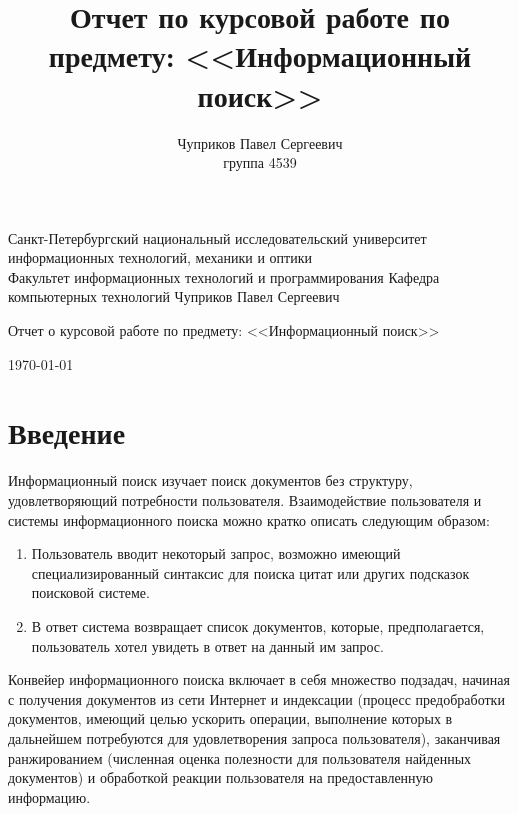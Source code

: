 \documentclass[12pt]{article}
\author{Чуприков Павел Сергеевич \\ группа 4539}
\title{Отчет по курсовой работе по предмету: <<Информационный поиск>>}
\begin{document}
\begin{titlepage}
\thispagestyle{empty}
\begin{center}
Санкт-Петербургский национальный исследовательский университет 
информационных технологий, механики и оптики\\
\smallskip
Факультет информационных технологий и программирования
\smallskip
Кафедра компьютерных технологий
\vspace{2cm}
\large{Чуприков Павел Сергеевич}\\
\vspace{1cm}
\begin{LARGE}
Отчет о курсовой работе по предмету: <<Информационный поиск>>\\
\end{LARGE}
\vfill
\today
\end{center}
\end{titlepage}

\setcounter{page}{2}
\tableofcontents
\pagebreak
\section{Введение}
Информационный поиск изучает поиск документов без структуру, удовлетворяющий 
потребности пользователя. Взаимодействие пользователя и системы информационного 
поиска можно кратко описать следующим образом:
\begin{enumerate}
\item Пользователь вводит некоторый запрос, возможно имеющий 
специализированный синтаксис для поиска цитат или других подсказок поисковой системе.
\item В ответ система возвращает список документов, которые, предполагается, 
пользователь хотел увидеть в ответ на данный им запрос.
\end{enumerate}

Конвейер информационного поиска включает в себя множество подзадач, начиная
с получения документов из сети Интернет и  индексации (процесс предобработки 
документов, имеющий целью ускорить операции, выполнение которых в дальнейшем 
потребуются для удовлетворения запроса пользователя), заканчивая ранжированием 
(численная оценка полезности для пользователя найденных документов) и 
обработкой реакции пользователя на предоставленную информацию.
\end{document}
